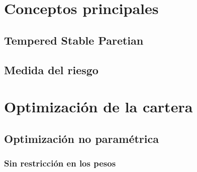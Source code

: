 \documentclass[12pt]{article}
\begin{document}

\section{Conceptos principales}





\subsection{Tempered Stable Paretian}




\subsection{Medida del riesgo}





\section{Optimización de la cartera}



\subsection{Optimización no paramétrica}


\subsubsection{Sin restricción en los pesos}
\end{document}
